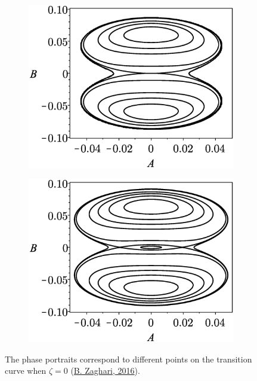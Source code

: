 \documentclass[LaTeX2e,10pt]{beamer}
\begin{document}
\begin{frame}
\begin{figure}
\quad
\begin{subfigure}[b]{0.35\textwidth}
{\includegraphics[width=\textwidth]{Images/PhasePortraitNdeltaOver2.eps}}
\caption{}%
\label{fig:pointc}
\end{subfigure}%
\begin{subfigure}[b]{0.35\textwidth}
{\includegraphics[width=\textwidth]{Images/PhasePortraitN1point2deltaOver2.eps}}
\caption{}%
\label{fig:pointd}
 \end{subfigure}%
\quad
\caption{The phase portraits correspond to different points on the transition curve when $\zeta=0$ (\href{https://eprints.soton.ac.uk/411397/}{B. Zaghari, 2016}).}
\label{fig:phasePortraitABplane}
\end{figure}
\end{frame}
\end{document}

